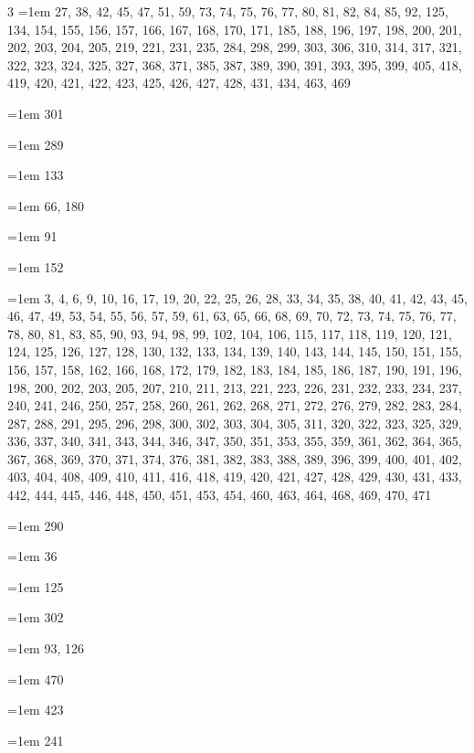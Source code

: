 \begin{multicols}{3}
\hangindent=1em  27, 38, 42, 45, 47, 51, 59, 73, 74, 75, 76, 77, 80, 81, 82, 84, 85, 92, 125, 134, 154, 155, 156, 157, 166, 167, 168, 170, 171, 185, 188, 196, 197, 198, 200, 201, 202, 203, 204, 205, 219, 221, 231, 235, 284, 298, 299, 303, 306, 310, 314, 317, 321, 322, 323, 324, 325, 327, 368, 371, 385, 387, 389, 390, 391, 393, 395, 399, 405, 418, 419, 420, 421, 422, 423, 425, 426, 427, 428, 431, 434, 463, 469\par
\hangindent=1em  301\par
\hangindent=1em  289\par
\hangindent=1em  133\par
\hangindent=1em  66, 180\par
\hangindent=1em  91\par
\hangindent=1em  152\par
\hangindent=1em  3, 4, 6, 9, 10, 16, 17, 19, 20, 22, 25, 26, 28, 33, 34, 35, 38, 40, 41, 42, 43, 45, 46, 47, 49, 53, 54, 55, 56, 57, 59, 61, 63, 65, 66, 68, 69, 70, 72, 73, 74, 75, 76, 77, 78, 80, 81, 83, 85, 90, 93, 94, 98, 99, 102, 104, 106, 115, 117, 118, 119, 120, 121, 124, 125, 126, 127, 128, 130, 132, 133, 134, 139, 140, 143, 144, 145, 150, 151, 155, 156, 157, 158, 162, 166, 168, 172, 179, 182, 183, 184, 185, 186, 187, 190, 191, 196, 198, 200, 202, 203, 205, 207, 210, 211, 213, 221, 223, 226, 231, 232, 233, 234, 237, 240, 241, 246, 250, 257, 258, 260, 261, 262, 268, 271, 272, 276, 279, 282, 283, 284, 287, 288, 291, 295, 296, 298, 300, 302, 303, 304, 305, 311, 320, 322, 323, 325, 329, 336, 337, 340, 341, 343, 344, 346, 347, 350, 351, 353, 355, 359, 361, 362, 364, 365, 367, 368, 369, 370, 371, 374, 376, 381, 382, 383, 388, 389, 396, 399, 400, 401, 402, 403, 404, 408, 409, 410, 411, 416, 418, 419, 420, 421, 427, 428, 429, 430, 431, 433, 442, 444, 445, 446, 448, 450, 451, 453, 454, 460, 463, 464, 468, 469, 470, 471\par
\hangindent=1em  290\par
\hangindent=1em  36\par
\hangindent=1em  125\par
\hangindent=1em  302\par
\hangindent=1em  93, 126\par
\hangindent=1em  470\par
\hangindent=1em  423\par
\hangindent=1em  241\par

\end{multicols}
